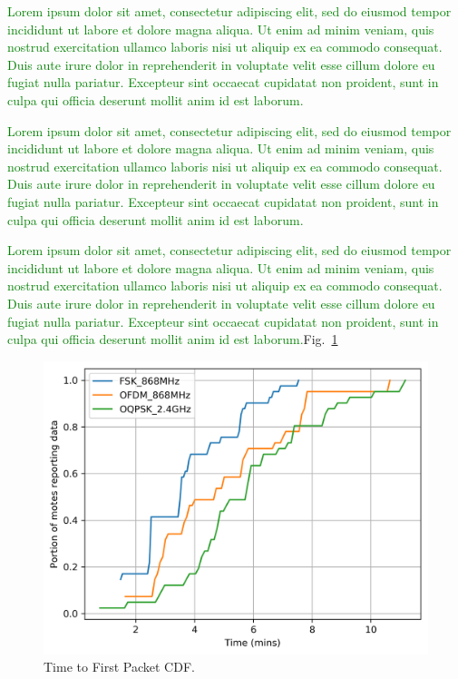 \documentclass[journal]{IEEEtran}
\newcommand{\lorem}        {\textcolor{green}{Lorem ipsum dolor sit amet, consectetur adipiscing elit, sed do eiusmod tempor incididunt ut labore et dolore magna aliqua. Ut enim ad minim veniam, quis nostrud exercitation ullamco laboris nisi ut aliquip ex ea commodo consequat. Duis aute irure dolor in reprehenderit in voluptate velit esse cillum dolore eu fugiat nulla pariatur. Excepteur sint occaecat cupidatat non proident, sunt in culpa qui officia deserunt mollit anim id est laborum.}}
\begin{document}
\lorem


\lorem


\lorem Fig.~\ref{fig:time_firstpacket_cdf}

\begin{figure}
	\centering
	\includegraphics[width=0.90\columnwidth]{time_firstpacket_cdf}
	\caption{Time to First Packet CDF.}
    \label{fig:time_firstpacket_cdf}
\end{figure}

\end{document}

